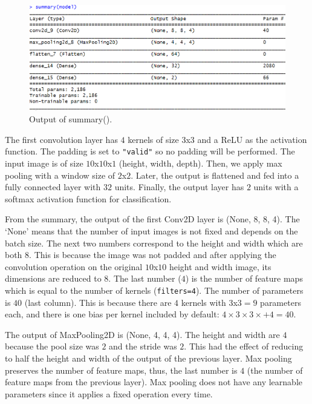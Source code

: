 \documentclass[
  11pt,
]{krantz}
\begin{document}
\begin{figure}

{\centering \includegraphics[width=0.9\linewidth]{images/cnn_summaryEx1} 

}

\caption{Output of summary().}\label{fig:cnnEx1}
\end{figure}

The first convolution layer has \(4\) kernels of size \(3\)x\(3\) and a ReLU as the activation function. The padding is set to \texttt{"valid"} so no padding will be performed. The input image is of size \(10\)x\(10\)x\(1\) (height, width, depth). Then, we apply max pooling with a window size of \(2\)x\(2\). Later, the output is flattened and fed into a fully connected layer with \(32\) units. Finally, the output layer has \(2\) units with a softmax activation function for classification.

From the summary, the output of the first Conv2D layer is (None, 8, 8, 4). The `None' means that the number of input images is not fixed and depends on the batch size. The next two numbers correspond to the height and width which are both \(8\). This is because the image was not padded and after applying the convolution operation on the original \(10\)x\(10\) height and width image, its dimensions are reduced to \(8\). The last number (\(4\)) is the number of feature maps which is equal to the number of kernels (\texttt{filters=4}). The number of parameters is \(40\) (last column). This is because there are \(4\) kernels with \(3\)x\(3=9\) parameters each, and there is one bias per kernel included by default: \(4 \times 3 \times 3 \times + 4 = 40\).

The output of MaxPooling2D is (None, 4, 4, 4). The height and width are \(4\) because the pool size was \(2\) and the stride was \(2\). This had the effect of reducing to half the height and width of the output of the previous layer. Max pooling preserves the number of feature maps, thus, the last number is \(4\) (the number of feature maps from the previous layer). Max pooling does not have any learnable parameters since it applies a fixed operation every time.
\end{document}
